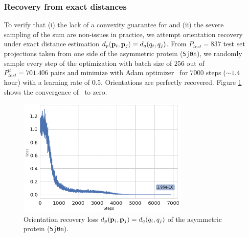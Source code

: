 \subsubsection{Recovery from exact distances}\label{sec:results:orientation-recovery:exact}


To verify that (i) the lack of a convexity guarantee for  and (ii) the severe sampling of the sum are non-issues in practice, we attempt orientation recovery under exact distance estimation $d_p(\mathbf{p}_i, \mathbf{p}_j) = d_q(q_i, q_j)$.
From $P_{test}=837$ test set projections taken from one side of the asymmetric protein (\texttt{5j0n}), we randomly sample every step of the optimization with batch size of $256$ out of $P_{test}^2 = \num{701,406}$ pairs and minimize  with Adam optimizer~\cite{kingma2014adam} for $\num{7000}$ steps ($\sim 1.4$ hour) with a learning rate of $0.5$.
Orientations are perfectly recovered.
Figure \ref{fig:5j0n-orientation-recovery-loss} shows the convergence of~ to zero.

\begin{figure}[b]
    \centering
        \includegraphics[height=5.9cm]{images/5j0n_perfect_angle_recovery.png}
    \caption{Orientation recovery loss $d_p(\mathbf{p}_i, \mathbf{p}_j) = d_q(q_i, q_j)$ of the asymmetric protein (\texttt{5j0n}).} %
    \label{fig:5j0n-orientation-recovery-loss}
\end{figure}

